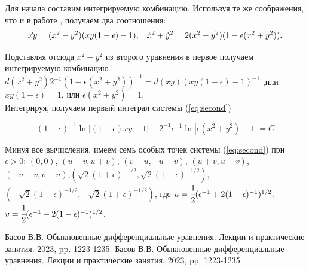 Для начала составим интегрируемую комбинацию. Используя те же соображения, что и в работе \cite{basov}, получаем два соотношения:
\begin{equation*}
\dot{xy} = (x^2-y^2)(xy(1-\epsilon)-1)\hbox{,\hspace{10pt}} \dot x^2+\dot y^2 = 2(x^2-y^2)(1-\epsilon(x^2+y^2)).
\end{equation*}

Подставляя отсюда $x^2-y^2$ из второго уравнения в первое получаем интегрируемую комбинацию $d(x^2+y^2)2^{-1}(1-\epsilon(x^2+y^2))^{-1}=d(xy)(xy(1-\epsilon)-1)^{-1}$ ,или $xy(1-\epsilon)=1$, или $\epsilon(x^2+y^2)=1$.\\

Интегрируя, получаем первый интеграл системы (\ref{eq:second}) 

\begin{equation}
    (1-\epsilon)^{-1}\ln|(1-\epsilon)xy -1|+2^{-1}\epsilon^{-1}\ln{|\epsilon(x^2+y^2)-1|}=C
\end{equation}

Минуя все вычисления, имеем семь особых точек системы (\ref{eq:second}) при $\epsilon > 0$: $(0,0)$, $(u-v,u+v)$, $(v-u,-u-v)$, $(u+v,u-v)$, $(-u-v,v-u)$,$(\sqrt{2}(1+\epsilon)^{-1/2}, \sqrt{2}(1+\epsilon)^{-1/2})$, $(-\sqrt{2}(1+\epsilon)^{-1/2}, -\sqrt{2}(1+\epsilon)^{-1/2})$, где $u=\cfrac{1}{2}(\epsilon^{-1}+2(1-\epsilon)^{-1})^{1/2}$, $v= \cfrac{1}{2}(\epsilon^{-1}-2(1-\epsilon)^{-1})^{1/2}$.

 \begin{thebibliography}{1}
 Басов В.В. \flqq 	Обыкновенные дифференциальные уравнения. Лекции и практические занятия\frqq. 2023, pp. 1223-1235.
 Басов В.В. \flqq 	Обыкновенные дифференциальные уравнения. Лекции и практические занятия\frqq. 2023, pp. 1223-1235.
\end{thebibliography}